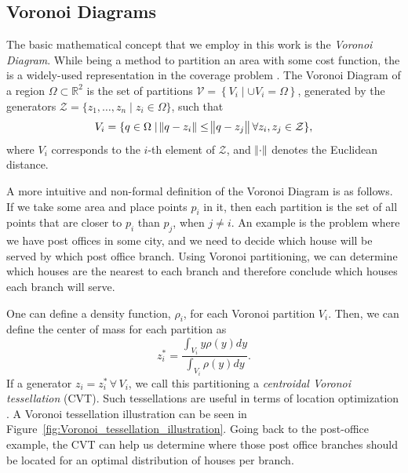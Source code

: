 \documentclass{iacas}
\newcommand{\rsqr}{\mathbb{R}^2}
\begin{document}
\subsection{Voronoi Diagrams}
The basic mathematical concept that we employ in this work is the \emph{Voronoi Diagram}. While being a method to partition an area with some cost function, the is a widely-used representation in the coverage problem \cite{Cortes2004,Hussein2007, Du1999}. The Voronoi Diagram of a region $\Omega \subset \rsqr$ is the set of partitions $\mathcal{V} = \left\{V_{i} \mid \cup V_{i} = \Omega\right\}$, generated by the generators $\mathcal{Z} = \{z_1,\ldots,z_n\mid z_{i} \in \Omega\}$, such that
\begin{equation} \label{Voronoi Definition}
V_{i} = \{q\in\Omega \mid \norm{q - z_i} \leq \norm{q - z_j} \forall z_i,z_j\in\mathcal{Z}\},
\end{equation}
where $V_{i}$ corresponds to the $i$-th element of $\mathcal{Z}$, and $\norm{\cdot}$ denotes the Euclidean distance.

A more intuitive and non-formal definition of the Voronoi Diagram is as follows. If we take some area and place points $p_i$ in it, then each partition is the set of all points that are closer to $p_i$ than $p_j$, when $j \neq i$. An example is the problem where we have post offices in some city, and we need to decide which house will be served by which post office branch. Using Voronoi partitioning, we can determine which houses are the nearest to each branch and therefore conclude which houses each branch will serve.

One can define a density function, $\rho_i$, for each Voronoi partition $V_{i}$. Then, we can define the center of mass for each partition as
\begin{equation}
z_{i}^{*} = \frac{\int_{V_{i}}y\rho(y)dy}{\int_{V_{i}}\rho(y)dy}.
\end{equation}
If a generator $z_{i} = z_{i}^{*} \, \forall \,V_{i}$, we call this partitioning a \emph{centroidal Voronoi tessellation} (CVT). Such tessellations are useful in terms of location optimization \cite{Cortes2004,Du1999,Atinc2013}.
A Voronoi tessellation illustration can be seen in Figure~\ref{fig:Voronoi_tessellation_illustration}. Going back to the post-office example, the CVT can help us determine where those post office branches should be located for an optimal distribution of houses per branch.
\end{document}

